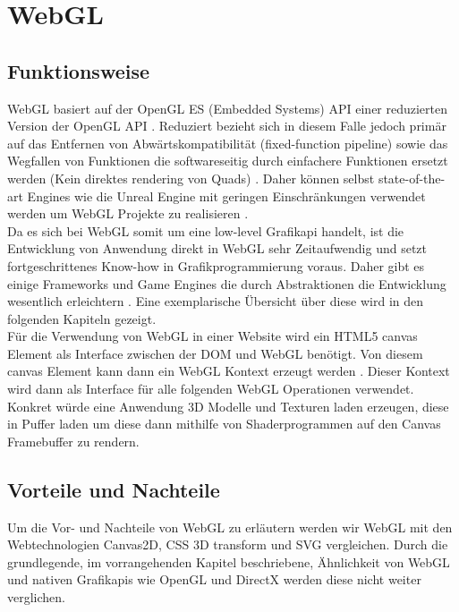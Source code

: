 \section{WebGL}
\subsection{Funktionsweise}
WebGL basiert auf der OpenGL ES (Embedded Systems) API \cite{parisi2012webgl} einer reduzierten Version der OpenGL API \cite{KhronosGLES}. Reduziert bezieht sich in diesem Falle jedoch primär auf das Entfernen von Abwärtskompatibilität (\zb fixed-function pipeline) sowie das Wegfallen von Funktionen die softwareseitig durch einfachere Funktionen ersetzt werden (\zb Kein direktes rendering von Quads) \cite{DiffGLES}. Daher können selbst state-of-the-art Engines wie die Unreal Engine mit geringen Einschränkungen verwendet werden um WebGL Projekte zu realisieren \cite{UnrealHTML5}\cite{UnrealLimits}. \\
Da es sich bei WebGL somit um eine low-level Grafikapi handelt, ist die Entwicklung von Anwendung direkt in WebGL sehr Zeitaufwendig und setzt fortgeschrittenes Know-how in Grafikprogrammierung voraus. Daher gibt es einige Frameworks und Game Engines die durch Abstraktionen die Entwicklung wesentlich erleichtern \cite{parisi2012webgl}. Eine exemplarische Übersicht über diese wird in den folgenden Kapiteln gezeigt. \\
Für die Verwendung von WebGL in einer Website wird ein HTML5 canvas Element als Interface zwischen der \ac{DOM} und WebGL benötigt. Von diesem canvas Element kann dann ein WebGL Kontext erzeugt werden \cite{parisi2012webgl}. Dieser Kontext wird dann als Interface für alle folgenden WebGL Operationen verwendet. Konkret würde eine Anwendung 3D Modelle und Texturen laden \bzw erzeugen, diese in Puffer laden um diese dann mithilfe von Shaderprogrammen auf den Canvas Framebuffer zu rendern. 
\subsection{Vorteile und Nachteile}
Um die Vor- und Nachteile von WebGL zu erläutern werden wir WebGL mit den Webtechnologien Canvas2D, CSS 3D transform und SVG vergleichen. Durch die grundlegende, im vorrangehenden Kapitel beschriebene, Ähnlichkeit von WebGL und nativen Grafikapis wie OpenGL und DirectX werden diese nicht weiter verglichen.

